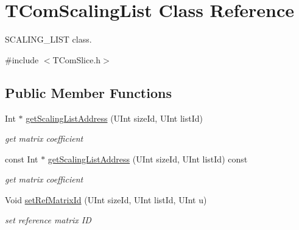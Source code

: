 \hypertarget{class_t_com_scaling_list}{}\section{T\+Com\+Scaling\+List Class Reference}
\label{class_t_com_scaling_list}


S\+C\+A\+L\+I\+N\+G\+\_\+\+L\+I\+ST class.  




{\ttfamily \#include $<$T\+Com\+Slice.\+h$>$}

\subsection*{Public Member Functions}
\begin{DoxyCompactItemize}
\item 
\mbox{\label{class_t_com_scaling_list_aa6f051c260f447d9f98a985565fc59dd}} 
Int $\ast$ \hyperlink{class_t_com_scaling_list_aa6f051c260f447d9f98a985565fc59dd}{get\+Scaling\+List\+Address} (U\+Int size\+Id, U\+Int list\+Id)
\begin{DoxyCompactList}\small\item\em get matrix coefficient \end{DoxyCompactList}\item 
\mbox{\label{class_t_com_scaling_list_a774b2a09cc7f9ff96e41f5b01509e300}} 
const Int $\ast$ \hyperlink{class_t_com_scaling_list_a774b2a09cc7f9ff96e41f5b01509e300}{get\+Scaling\+List\+Address} (U\+Int size\+Id, U\+Int list\+Id) const
\begin{DoxyCompactList}\small\item\em get matrix coefficient \end{DoxyCompactList}\item 
\mbox{\label{class_t_com_scaling_list_a8fb0d4a8f32d7313e4829fc98130ea35}} 
Void \hyperlink{class_t_com_scaling_list_a8fb0d4a8f32d7313e4829fc98130ea35}{set\+Ref\+Matrix\+Id} (U\+Int size\+Id, U\+Int list\+Id, U\+Int u)
\begin{DoxyCompactList}\small\item\em set reference matrix ID \end{DoxyCompactList}\item 
\mbox{\label{class_t_com_scaling_list_a6f180c44df5ad18677c56146523f17d3}} 

\end{DoxyCompactItemize}
